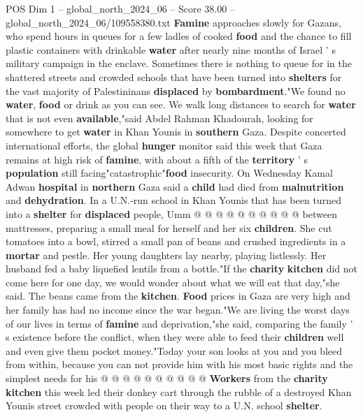 \begin{textsample}{POS Dim 1 – global\_north\_2024\_06 – Score 38.00 – global\_north\_2024\_06/109558380.txt}  \label{ex:f1_pos_238}
\textbf{Famine} approaches slowly for Gazans, who spend hours in queues for a few ladles of cooked \textbf{food} and the chance to fill plastic containers with drinkable \textbf{water} after nearly nine months of Israel ' s military campaign in the enclave.
Sometimes there is nothing to queue for in the shattered streets and crowded schools that have been turned into \textbf{shelters} for the vast majority of Palestininans \textbf{displaced} by \textbf{bombardment}."We found no \textbf{water}, \textbf{food} or drink as you can see.
We walk long distances to search for \textbf{water} that is not even \textbf{available},"said Abdel Rahman Khadourah, looking for somewhere to get \textbf{water} in Khan Younis in \textbf{southern} Gaza.
Despite concerted international efforts, the global \textbf{hunger} monitor said this week that Gaza remains at high risk of \textbf{famine}, with about a fifth of the \textbf{territory} ' s \textbf{population} still facing"catastrophic"\textbf{food} insecurity.
On Wednesday Kamal Adwan \textbf{hospital} in \textbf{northern} Gaza said a \textbf{child} had died from \textbf{malnutrition} and \textbf{dehydration}.
In a U.N.-run school in Khan Younis that has been turned into a \textbf{shelter} for \textbf{displaced} people, Umm @ @ @ @ @ @ @ @ @ @ between mattresses, preparing a small meal for herself and her six \textbf{children}.
She cut tomatoes into a bowl, stirred a small pan of beans and crushed ingredients in a \textbf{mortar} and pestle.
Her young daughters lay nearby, playing listlessly.
Her husband fed a baby liquefied lentils from a bottle."If the \textbf{charity} \textbf{kitchen} did not come here for one day, we would wonder about what we will eat that day,"she said.
The beans came from the \textbf{kitchen}. \textbf{Food} prices in Gaza are very high and her family has had no income since the war began."We are living the worst days of our lives in terms of \textbf{famine} and deprivation,"she said, comparing the family ' s existence before the conflict, when they were able to feed their \textbf{children} well and even give them pocket money."Today your son looks at you and you bleed from within, because you can not provide him with his most basic rights and the simplest needs for his @ @ @ @ @ @ @ @ @ @ \textbf{Workers} from the \textbf{charity} \textbf{kitchen} this week led their donkey cart through the rubble of a destroyed Khan Younis street crowded with people on their way to a U.N. school \textbf{shelter}.

\end{textsample}
